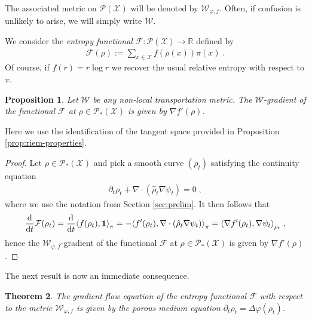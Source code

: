 \documentclass[a4paper,11pt,reqno]{amsart}
\theoremstyle{plain}
\newtheorem{theorem}{Theorem}[section]
\newtheorem{proposition}[theorem]{Proposition}
\theoremstyle{remark}
\numberwithin{equation}{section}
\begin{document}
The associated metric on ${{\mathscr{P}}({\mathcal{X}})}$ will be denoted by 
${\mathcal{W}}_{{\varphi}, f}$. Often, if confusion is unlikely to arise, we will  simply write ${\mathcal{W}}$.

We consider the \emph{entropy functional} ${\mathcal{F}} : {{\mathscr{P}}({\mathcal{X}})} \to {{\mathbb R}}$ defined by
\begin{align}\label{eq:f-entropy}
 {\mathcal{F}}(\rho) := \sum_{x \in {\mathcal{X}}} f(\rho(x)) \pi(x)\;.
\end{align}
Of course, if $f(r) = r \log r$ we recover the usual relative entropy
with respect to $\pi$.

\begin{proposition}\label{prop:grad-F}
  Let ${\mathcal{W}}$ be any non-local transportation metric. The ${\mathcal{W}}$-gradient
  of the functional ${\mathcal{F}}$ at $\rho \in{{\mathscr{P}}_*({\mathcal{X}})}$ is given by $\nabla
  f'(\rho)$.
\end{proposition}

Here we use the identification of the tangent space provided in
Proposition \ref{prop:riem-properties}.

\begin{proof}
  Let $\rho \in {{\mathscr{P}}_*({\mathcal{X}})}$ and pick a smooth curve $(\rho_t)$ satisfying
  the continuity equation
\begin{align*}
\partial_t \rho_t + \nabla \cdot ({\hat\rho}_t \nabla \psi_t) = 0\;,
\end{align*}
where we use the notation from Section \ref{sec:prelim}.
It then follows that
\begin{align*}
 {\frac{\mathrm{d}}{\mathrm{d}t}} {\mathcal{F}}(\rho_t) 
   =  {\frac{\mathrm{d}}{\mathrm{d}t}} {\langle {{f(\rho_t), {{{\bf 1}}}}}\rangle}_\pi
   =  -{\langle {{f'(\rho_t), \nabla \cdot ({\hat\rho}_t \nabla \psi_t) }}\rangle}_\pi
   =   {\langle {{\nabla f'(\rho_t), \nabla \psi_t}}\rangle}_{\rho_t}\;,
\end{align*}
hence the ${\mathcal{W}}_{{\varphi}, f}$-gradient of the functional ${\mathcal{F}}$ at $\rho
\in{{\mathscr{P}}_*({\mathcal{X}})}$ is given by $\nabla f'(\rho)$.
\end{proof}

The next result is now an immediate consequence.

\begin{theorem}\label{thm:gradient-flow}
  The gradient flow equation 
  of the entropy functional ${\mathcal{F}}$ with respect to the
  metric ${\mathcal{W}}_{{\varphi},f}$ is given by the
  porous medium equation $\partial_t \rho_t = \Delta {\varphi}(\rho_t)$.
\end{theorem}
\end{document}
